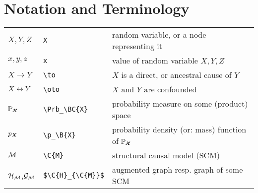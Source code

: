 \newpage
\section*{Notation and Terminology}

\begin{tabular}{lll}

$X, Y, Z$           & \verb.X.              & random variable, or a node representing it \\
$x, y, z$           & \verb.x.              & value of random variable $X, Y, Z$ \\
$X\to Y$            & \verb.\to.            & $X$ is a direct, or ancestral cause of $Y$ \\
$X\leftrightarrow Y$           & \verb.\oto.           & $X$ and $Y$ are confounded \\
$\mathbb{P}_{\bm{\mathcal{X}}}$     & \verb.\Prb_\BC{X}.    & probability measure on some (product) space \\
$p_{\bm{X}}$         & \verb.\p_\B{X}.       & probability density (or: mass) function of $\mathbb{P}_{\bm{\mathcal{X}}}$ \\
$\mathcal{M}$             & \verb.\C{M}.          & structural causal model (SCM) \\
$\mathcal{H}_{\mathcal{M}}$,$\mathcal{G}_{\mathcal{M}}$ & \verb.$\C{H}_{\C{M}}$. & augmented graph resp. graph of some SCM \\



\end{tabular}